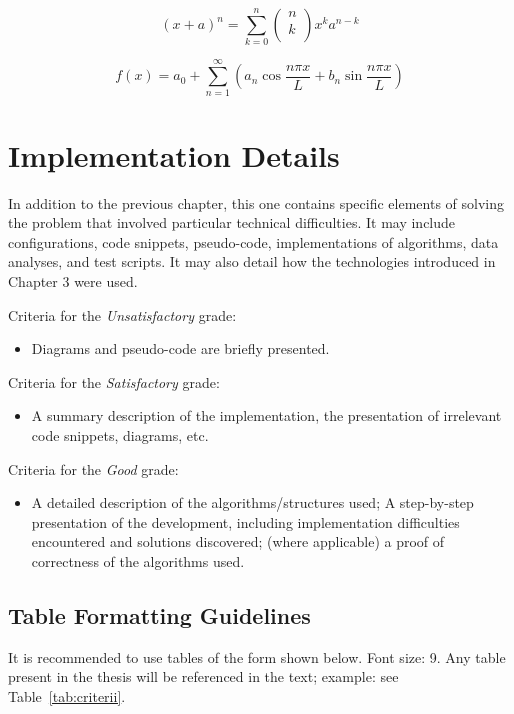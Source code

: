 \documentclass[12pt,a4paper]{report}
\begin{document}
\begin{equation}
(x+a)^n = \sum_{k=0}^{n}\left(\begin{array}{c}n\\k\\\end{array}\right)x^ka^{n-k}
\end{equation}

\begin{equation}
f(x) = a_0 + \sum_{n=1}^{\infty}\left(a_n \cos\frac{n\pi x}{L} + b_n\sin\frac{n\pi x}{L}\right)
\end{equation}



\chapter{Implementation Details}
In addition to the previous chapter, this one contains specific elements of solving the problem that involved particular technical difficulties. It may include configurations, code snippets, pseudo-code, implementations of algorithms, data analyses, and test scripts. It may also detail how the technologies introduced in Chapter 3 were used.


Criteria for the \textit{Un\textit{satisfactory}} grade:
\begin{itemize}
	\item	Diagrams and pseudo-code are briefly presented.
\end{itemize}
Criteria for the \textit{Satisfactory} grade:
\begin{itemize}
	\item	A summary description of the implementation, the presentation of irrelevant code snippets, diagrams, etc.
\end{itemize}
Criteria for the \textit{Good} grade:
\begin{itemize}
	\item	A detailed description of the algorithms/structures used; A step-by-step presentation of the development, including implementation difficulties encountered and solutions discovered; (where applicable) a proof of correctness of the algorithms used.
\end{itemize}

\section{Table Formatting Guidelines}
It is recommended to use tables of the form shown below.  Font size:  9.
Any table present in the thesis will be referenced in the text; example: see Table~\ref{tab:criterii}.
\end{document}
